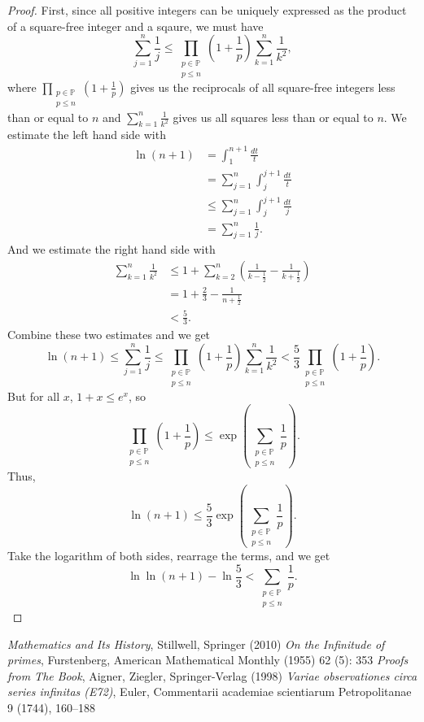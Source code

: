 \documentclass[a4paper]{article}
\theoremstyle{definition}
\theoremstyle{remark}
\begin{document}
\begin{proof}
  First, since all positive integers can be uniquely expressed as the product of a square-free integer and a sqaure, we must have
  \[
  \sum_{j=1}^n\frac{1}{j}\le\prod_{\substack{p\in\mathbb{P}\\p\le n}}\left( 1+\frac{1}{p} \right)\sum_{k=1}^n\frac{1}{k^2}
  ,
  \]
  where $\displaystyle\prod_{\substack{p\in\mathbb{P}\\p\le n}}\left( 1+\frac{1}{p} \right)$ gives us the reciprocals of all square-free integers less than or equal to $n$ and $\displaystyle\sum_{k=1}^n\frac{1}{k^2}$ gives us all squares less than or equal to $n$.
  We estimate the left hand side with
  \begin{align*}
    \ln(n+1)&=\int_1^{n+1}\frac{dt}{t}\\
    &=\sum_{j=1}^n\int_j^{j+1}\frac{dt}{t}\\
    &\le\sum_{j=1}^n\int_j^{j+1}\frac{dt}{j}\\
    &=\sum_{j=1}^n\frac{1}{j}
    .
  \end{align*}
  And we estimate the right hand side with
  \begin{align*}
    \sum_{k=1}^n\frac{1}{k^2}&\le1+\sum_{k=2}^n\left( \frac{1}{k-\frac{1}{2}}-\frac{1}{k+\frac{1}{2}} \right)\\
    &=1+\frac{2}{3}-\frac{1}{n+\frac{1}{2}}\\
    &<\frac{5}{3}
    .
  \end{align*}
  Combine these two estimates and we get
  \[
  \ln(n+1)\le\sum_{j=1}^n\frac{1}{j}\le\prod_{\substack{p\in\mathbb{P}\\p\le n}}\left( 1+\frac{1}{p} \right)\sum_{k=1}^n\frac{1}{k^2}<\frac{5}{3}\prod_{\substack{p\in\mathbb{P}\\p\le n}}\left( 1+\frac{1}{p} \right)
  .
  \]
  But for all $x$, $1+x\le e^{x}$, so
  \[
  \prod_{\substack{p\in\mathbb{P}\\p\le n}}\left( 1+\frac{1}{p} \right)\le \exp\left( \sum_{\substack{p\in\mathbb{P}\\p\le n}}\frac{1}{p} \right)
  .
  \]
  Thus,
  \[
  \ln(n+1)\le \frac{5}{3} \exp \left( \sum_{\substack{p\in\mathbb{P}\\p\le n}}\frac{1}{p} \right)
  .
  \]
  Take the logarithm of both sides, rearrage the terms, and we get
  \[
  \ln\ln(n+1)-\ln\frac{5}{3}<\sum_{\substack{p\in\mathbb{P}\\p\le n}}\frac{1}{p}
  .
  \]
\end{proof}

\begin{thebibliography}{12}
    \textit{Mathematics and Its History}, Stillwell, Springer (2010)
    \textit{On the Infinitude of primes}, Furstenberg, American Mathematical Monthly (1955) 62 (5): 353
    \textit{Proofs from The Book}, Aigner, Ziegler, Springer-Verlag (1998)
    \textit{Variae observationes circa series infinitas (E72)}, Euler, Commentarii academiae scientiarum
    Petropolitanae 9 (1744), 160–188
\end{thebibliography}
\end{document}
